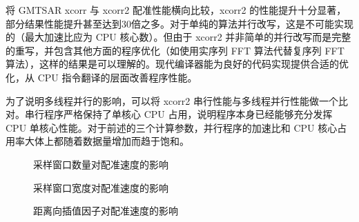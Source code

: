 将 GMTSAR xcorr 与 xcorr2 配准性能横向比较，xcorr2 的性能提升十分显著，部分结果性能提升甚至达到30倍之多。对于单纯的算法并行改写，这是不可能实现的（最大加速比应为 CPU 核心数）。但由于 xcorr2 并非简单的并行改写而是完整的重写，并包含其他方面的程序优化（如使用实序列 FFT 算法代替复序列 FFT 算法），这样的结果是可以理解的。现代编译器能为良好的代码实现提供合适的优化，从 CPU 指令翻译的层面改善程序性能。

为了说明多线程并行的影响，可以将 xcorr2 串行性能与多线程并行性能做一个比对。串行程序严格保持了单核心 CPU 占用，说明程序本身已经能够充分发挥 CPU 单核心性能。对于前述的三个计算参数，并行程序的加速比和 CPU 核心占用率大体上都随着数据量增加而趋于饱和。

\begin{figure}[htbp]
\centering
\subfloat[程序计算时间]{
    \label{fig:exp_nxy_a}
    \begin{minipage}[t]{0.49\textwidth}
        \centering
        \resizebox {\textwidth} {!} {
            
        }
    \end{minipage}
}
\caption{采样窗口数量对配准速度的影响} \label{fig:exp_nxy}
\end{figure}

\begin{figure}[htbp]
\centering
\subfloat[程序计算时间]{
    \label{fig:exp_xsys_a}
    \begin{minipage}[t]{0.49\textwidth}
        \centering
        \resizebox {\textwidth} {!} {
            
        }
    \end{minipage}
}
\caption{采样窗口宽度对配准速度的影响} \label{fig:exp_xsys}
\end{figure}

\begin{figure}[htbp]
\centering
\subfloat[程序计算时间]{
    \label{fig:exp_ri_a}
    \begin{minipage}[t]{0.49\textwidth}
        \centering
        \resizebox {\textwidth} {!} {
            
        }
    \end{minipage}
}
\caption{距离向插值因子对配准速度的影响} \label{fig:exp_ri}
\end{figure}

